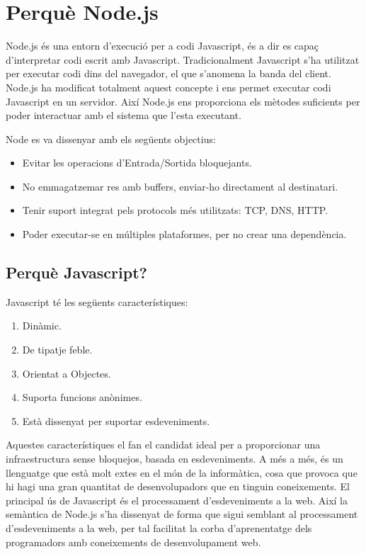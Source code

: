\chapter{Perquè Node.js}
\label{sec:node.js-full}

Node.js és una entorn d'execució per a codi Javascript, és a dir es capaç d'interpretar codi escrit amb Javascript. Tradicionalment Javascript s'ha utilitzat per executar codi dins del navegador, el que s'anomena la banda del client. Node.js ha modificat totalment aquest concepte i ens permet executar codi Javascript en un servidor. Així Node.js ens proporciona els mètodes suficients per poder interactuar amb el sistema que l'esta executant.

Node es va dissenyar amb els següents objectius: 

\begin{itemize}
    \item{Evitar les operacions d'Entrada/Sortida bloquejants.}
    \item{No emmagatzemar res amb buffers, enviar-ho directament al destinatari.}
    \item{Tenir suport integrat pels protocols més utilitzats: TCP, DNS, HTTP.}
    \item{Poder executar-se en múltiples plataformes, per no crear una dependència.}
\end{itemize}

\section{Perquè Javascript?}

Javascript té les següents característiques: 

\begin{enumerate}
    \item{Dinàmic.}
    \item{De tipatje feble.}
    \item{Orientat a Objectes.}
    \item{Suporta funcions anònimes.}
    \item{Està dissenyat per suportar esdeveniments.}
\end{enumerate}

Aquestes característiques el fan el candidat ideal per a proporcionar una infraestructura sense bloquejos, basada en esdeveniments. A més a més, és un llenguatge que està molt extes en el món de la informàtica, cosa que provoca que hi hagi una gran quantitat de desenvolupadors que en tinguin coneixements. El principal ús de Javascript és el processament d'esdeveniments a la web. Així la semàntica de Node.js s'ha dissenyat de forma que sigui semblant al processament d'esdeveniments a la web, per tal facilitat la corba d'aprenentatge dels programadors amb coneixements de desenvolupament web.

